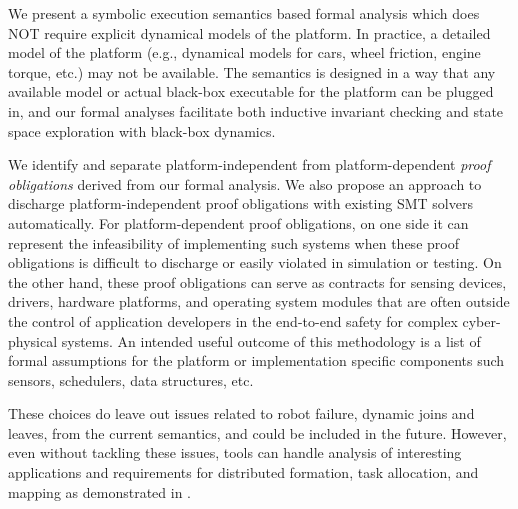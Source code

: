 \begin{noinditem}
\item We present a \K symbolic execution semantics based formal analysis which does NOT require explicit dynamical models of the platform.
In practice, a detailed model of the platform (e.g., dynamical models for cars, wheel friction, engine torque, etc.) may not be available.
The \lgname semantics is designed in a way that any available model or actual black-box executable for the platform can be plugged in,
and our formal analyses facilitate both inductive invariant checking and state space exploration with black-box dynamics.

\item We identify and separate platform-independent from platform-dependent \emph{proof obligations} derived from our formal analysis.
We also propose an approach to discharge platform-independent proof obligations with existing SMT solvers automatically.
For platform-dependent proof obligations,
on one side it can represent the infeasibility of implementing such systems
when these proof obligations is difficult to discharge or easily violated in simulation or testing.
On the other hand,
these proof obligations can serve as contracts for sensing devices, drivers, hardware platforms, and operating system modules
that are often outside the control of application developers in the end-to-end safety for complex cyber-physical systems.
An intended useful outcome of this methodology is a list of formal assumptions for the platform or implementation specific components such sensors, schedulers, data structures, etc.
\end{noinditem}
%
These choices do leave out issues related to robot failure, dynamic joins and leaves, from the current semantics, and could be included in the future.
However, even without tackling these issues, \lgname tools can handle analysis of interesting applications and requirements
for distributed formation, task allocation, and mapping as demonstrated in .


